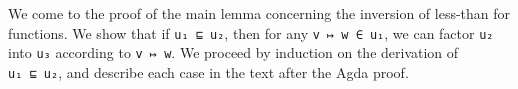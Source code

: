 We come to the proof of the main lemma concerning the inversion of
less-than for functions. We show that if \texttt{u₁\ ⊑\ u₂}, then for
any \texttt{v\ ↦\ w\ ∈\ u₁}, we can factor \texttt{u₂} into \texttt{u₃}
according to \texttt{v\ ↦\ w}. We proceed by induction on the derivation
of \texttt{u₁\ ⊑\ u₂}, and describe each case in the text after the Agda
proof.

\begin{fence}
\begin{code}%
\>[0]%
\>[2449I]\AgdaSymbol{:}\AgdaSpace{}%
\AgdaSpace{}%
\AgdaSpace{}%
\AgdaSymbol{:}\AgdaSpace{}%
\AgdaSymbol{\}}\<%
\\
\>[.][@{}l@{}]\<[2449I]%
\>[8]\AgdaSpace{}%
\AgdaSpace{}%
\AgdaSpace{}%
\<%
\\
%
\>[8]%
\>[2457I]\AgdaSpace{}%
\AgdaSymbol{\}}\AgdaSpace{}%
\AgdaSpace{}%
\AgdaSpace{}%
\AgdaSpace{}%
\AgdaSpace{}%
\AgdaSpace{}%
\<%
\\
\>[.][@{}l@{}]\<[2457I]%
\>[10]\AgdaComment{-------------------------------------}\<%
\\
%
\>[8]\AgdaSpace{}%
\AgdaFunction{Σ[}\AgdaSpace{}%
\AgdaSpace{}%
\AgdaSpace{}%
\AgdaSpace{}%
\AgdaFunction{]}\AgdaSpace{}%
\AgdaSpace{}%
\AgdaSpace{}%
\AgdaSpace{}%
\AgdaSpace{}%
\<%
\\
\>[0]\AgdaSpace{}%
\AgdaSymbol{\{}\AgdaSymbol{\}}\AgdaSpace{}%
\AgdaSymbol{\{}\AgdaSymbol{\}}\AgdaSpace{}%
\AgdaSpace{}%
\AgdaSymbol{\{}\AgdaSymbol{\}}\AgdaSpace{}%
\AgdaSymbol{\{}\AgdaSymbol{\}}\AgdaSpace{}%
\AgdaSymbol{()}\<%
\\
\>[0]\AgdaSpace{}%
\AgdaSymbol{\{}\AgdaSpace{}%
\AgdaSpace{}%
\AgdaSymbol{\}}\AgdaSpace{}%
\AgdaSymbol{\{}\AgdaSymbol{\}}\AgdaSpace{}%
\AgdaSymbol{(}\AgdaSpace{}%
\AgdaSpace{}%
\AgdaSymbol{)}\AgdaSpace{}%
\AgdaSymbol{\{}\AgdaSymbol{\}}\AgdaSpace{}%

\end{code}
\end{fence}
